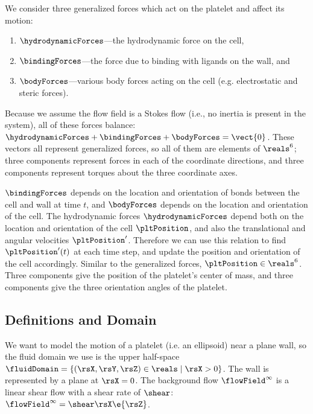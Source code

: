 We consider three generalized forces which act on the platelet and
affect its motion:
\begin{enumerate}
\item $\hydrodynamicForces$---the hydrodynamic force on the cell, 
\item $\bindingForces$---the force due to binding with ligands on the wall, and
\item $\bodyForces$---various body forces acting on the cell
  (e.g. electrostatic and steric forces).
\end{enumerate}
Because we assume the flow field is a Stokes flow (i.e., no inertia is
present in the system), all of these forces balance:
$\hydrodynamicForces + \bindingForces + \bodyForces = \vect{0}$. These
vectors all represent generalized forces, so all of them are elements
of $\reals^6$; three components represent forces in each of the
coordinate directions, and three components represent torques about
the three coordinate axes.

$\bindingForces$ depends on the location and orientation of bonds
between the cell and wall at time $t$, and $\bodyForces$ depends on
the location and orientation of the cell. The hydrodynamic forces
$\hydrodynamicForces$ depend both on the location and orientation of
the cell $\pltPosition$, and also the translational and angular
velocities $\pltPosition'$. Therefore we can use this relation to find
$\pltPosition'(t)$ at each time step, and update the position and
orientation of the cell accordingly. Similar to the generalized
forces, $\pltPosition \in \reals^6$. Three components give the
position of the platelet's center of mass, and three components give
the three orientation angles of the platelet.

\subsection{Definitions and Domain}
\label{sec:definitions-domain}

We want to model the motion of a platelet (i.e. an ellipsoid) near a
plane wall, so the fluid domain we use is the upper half-space
$\fluidDomain = \{(\rsX, \rsY, \rsZ) \in \reals \mid \rsX > 0\}$. The wall
is represented by a plane at $\rsX = 0$. The background flow
$\flowField^\infty$ is a linear shear flow with a shear rate of
$\shear$: $\flowField^\infty = \shear \rsX \e{\rsZ}$.

